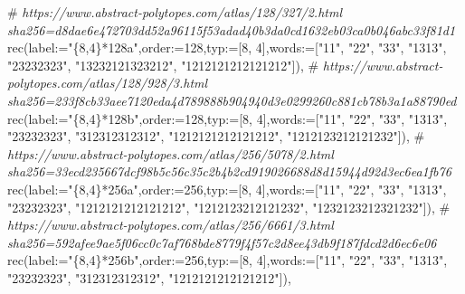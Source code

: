 \documentclass[
  10pt,
  letterpaper,
]{article}
\newenvironment{Shaded}{}{}
\newcommand{\CommentTok}[1]{\textcolor[rgb]{0.38,0.63,0.69}{\textit{#1}}}
\newcommand{\ExtensionTok}[1]{#1}
\newcommand{\FloatTok}[1]{\textcolor[rgb]{0.25,0.63,0.44}{#1}}
\newcommand{\NormalTok}[1]{#1}
\newcommand{\OperatorTok}[1]{\textcolor[rgb]{0.40,0.40,0.40}{#1}}
\newcommand{\StringTok}[1]{\textcolor[rgb]{0.25,0.44,0.63}{#1}}
\newcommand{\VariableTok}[1]{\textcolor[rgb]{0.10,0.09,0.49}{#1}}
\begin{document}
\begin{Shaded}
\begin{Highlighting}[]
\NormalTok{\#}\CommentTok{ https://www.abstract{-}polytopes.com/atlas/128/327/2.html sha256=d8dae6e472703dd52a96115f53adad40b3da0cd1632eb03ca0b046abc33f81d1}
\ExtensionTok{rec}\NormalTok{(}\VariableTok{label}\OperatorTok{:=}\StringTok{"\{8,4\}*128a"}\OperatorTok{,}\VariableTok{order}\OperatorTok{:=}\FloatTok{128}\OperatorTok{,}\VariableTok{typ}\OperatorTok{:=}\NormalTok{[}\FloatTok{8}\OperatorTok{,} \FloatTok{4}\NormalTok{]}\OperatorTok{,}\VariableTok{words}\OperatorTok{:=}\NormalTok{[}\StringTok{"11"}\OperatorTok{,} \StringTok{"22"}\OperatorTok{,} \StringTok{"33"}\OperatorTok{,} \StringTok{"1313"}\OperatorTok{,} \StringTok{"23232323"}\OperatorTok{,} \StringTok{"13232121323212"}\OperatorTok{,} \StringTok{"1212121212121212"}\NormalTok{])}\OperatorTok{,}
\NormalTok{\#}\CommentTok{ https://www.abstract{-}polytopes.com/atlas/128/928/3.html sha256=233f8cb33aee7120eda4d789888b904940d3e0299260c881cb78b3a1a88790ed}
\ExtensionTok{rec}\NormalTok{(}\VariableTok{label}\OperatorTok{:=}\StringTok{"\{8,4\}*128b"}\OperatorTok{,}\VariableTok{order}\OperatorTok{:=}\FloatTok{128}\OperatorTok{,}\VariableTok{typ}\OperatorTok{:=}\NormalTok{[}\FloatTok{8}\OperatorTok{,} \FloatTok{4}\NormalTok{]}\OperatorTok{,}\VariableTok{words}\OperatorTok{:=}\NormalTok{[}\StringTok{"11"}\OperatorTok{,} \StringTok{"22"}\OperatorTok{,} \StringTok{"33"}\OperatorTok{,} \StringTok{"1313"}\OperatorTok{,} \StringTok{"23232323"}\OperatorTok{,} \StringTok{"312312312312"}\OperatorTok{,} \StringTok{"1212121212121212"}\OperatorTok{,} \StringTok{"1212123212121232"}\NormalTok{])}\OperatorTok{,}
\NormalTok{\#}\CommentTok{ https://www.abstract{-}polytopes.com/atlas/256/5078/2.html sha256=33ecd235667dcf98b5c56c35c2b4b2cd919026688d8d15944d92d3ec6ea1fb76}
\ExtensionTok{rec}\NormalTok{(}\VariableTok{label}\OperatorTok{:=}\StringTok{"\{8,4\}*256a"}\OperatorTok{,}\VariableTok{order}\OperatorTok{:=}\FloatTok{256}\OperatorTok{,}\VariableTok{typ}\OperatorTok{:=}\NormalTok{[}\FloatTok{8}\OperatorTok{,} \FloatTok{4}\NormalTok{]}\OperatorTok{,}\VariableTok{words}\OperatorTok{:=}\NormalTok{[}\StringTok{"11"}\OperatorTok{,} \StringTok{"22"}\OperatorTok{,} \StringTok{"33"}\OperatorTok{,} \StringTok{"1313"}\OperatorTok{,} \StringTok{"23232323"}\OperatorTok{,} \StringTok{"1212121212121212"}\OperatorTok{,} \StringTok{"1212123212121232"}\OperatorTok{,} \StringTok{"1232123212321232"}\NormalTok{])}\OperatorTok{,}
\NormalTok{\#}\CommentTok{ https://www.abstract{-}polytopes.com/atlas/256/6661/3.html sha256=592afee9ae5f06cc0c7af768bde8779f4f57c2d8ee43db9f187fdcd2d6ec6e06}
\ExtensionTok{rec}\NormalTok{(}\VariableTok{label}\OperatorTok{:=}\StringTok{"\{8,4\}*256b"}\OperatorTok{,}\VariableTok{order}\OperatorTok{:=}\FloatTok{256}\OperatorTok{,}\VariableTok{typ}\OperatorTok{:=}\NormalTok{[}\FloatTok{8}\OperatorTok{,} \FloatTok{4}\NormalTok{]}\OperatorTok{,}\VariableTok{words}\OperatorTok{:=}\NormalTok{[}\StringTok{"11"}\OperatorTok{,} \StringTok{"22"}\OperatorTok{,} \StringTok{"33"}\OperatorTok{,} \StringTok{"1313"}\OperatorTok{,} \StringTok{"23232323"}\OperatorTok{,} \StringTok{"312312312312"}\OperatorTok{,} \StringTok{"1212121212121212"}\NormalTok{])}\OperatorTok{,}

\end{Highlighting}
\end{Shaded}
\end{document}
